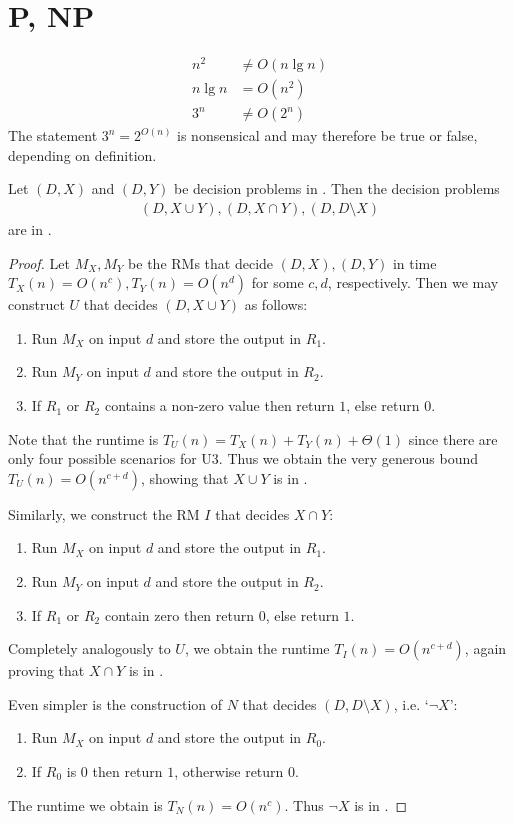 \documentclass{article}
\begin{document}
\section{P, NP}

\begin{claim*}[a]
	\begin{align}
		\label{on2}
		n^2    & \not=O(n\lg n) \\
		\label{onlgn}
		n\lg n & =O(n^2)        \\
		\label{o3n}
		3^n    & \not=O(2^n)
	\end{align}
	The statement $3^n=2^{O(n)}$ is nonsensical and may therefore be true or false, depending on
	definition.
\end{claim*}

\begin{claim*}[b]
	Let $(D,X)$ and $(D,Y)$ be decision problems in \ptime. Then the decision problems
	\begin{align*}
		(D,X\cup Y), (D,X\cap Y), (D,D\setminus X)
	\end{align*}
	are in \ptime.
	\begin{proof}
		Let $M_X,M_Y$ be the RMs that decide $(D,X),(D,Y)$ in time $T_X(n)=O(n^c),T_Y(n)=O(n^d)$ for some $c,d$,
		respectively. Then we may construct $U$ that decides $(D,X\cup Y)$ as follows:
		\begin{enumerate}[label=U\arabic*]
			\item Run $M_X$ on input $d$ and store the output in $R_1$.
			\item Run $M_Y$ on input $d$ and store the output in $R_2$.
			\item If $R_1$ or $R_2$ contains a non-zero value then return $1$, else return $0$.
		\end{enumerate}
		Note that the runtime is $T_U(n)=T_X(n)+T_Y(n)+\Theta(1)$ since there are only four possible scenarios
		for U3. Thus we obtain the very generous bound $T_U(n)=O(n^{c+d})$, showing that $X\cup Y$ is in \ptime.

		Similarly, we construct the RM $I$ that decides $X\cap Y$:
		\begin{enumerate}[label=I\arabic*]
			\item Run $M_X$ on input $d$ and store the output in $R_1$.
			\item Run $M_Y$ on input $d$ and store the output in $R_2$.
			\item If $R_1$ or $R_2$ contain zero then return $0$, else return $1$.
		\end{enumerate}
		Completely analogously to $U$, we obtain the runtime $T_I(n)=O(n^{c+d})$, again proving that
		$X\cap Y$ is in \ptime.

		Even simpler is the construction of $N$ that decides $(D, D\setminus X)$, i.e. `$\neg X$':
		\begin{enumerate}[label=N\arabic*]
			\item Run $M_X$ on input $d$ and store the output in $R_0$.
			\item If $R_0$ is $0$ then return $1$, otherwise return $0$.
		\end{enumerate}
		The runtime we obtain is $T_N(n)=O(n^c)$. Thus $\neg X$ is in \ptime.
	\end{proof}
\end{claim*}
\end{document}
